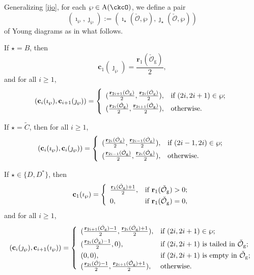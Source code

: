 \documentclass[12pt,a4paper]{amsart}
\newcommand{\CO}{{\mathcal {O}}}
\numberwithin{equation}{section}
\theoremstyle{remark}
\begin{document}
  Generalizing \eqref{ijo}, for each $\wp\in  {\mathrm A}(\ckcO)$,    we define a pair \[
(\imath_\wp, \jmath_\wp):=(\imath_\star(\check \CO, \wp), \jmath_\star(\check \CO, \wp))
\]
 of Young diagrams  as in what follows.

If $\star=B$, then
 \[
   \mathbf c_{1}(\jmath_\wp)=\frac{\mathbf r_1(\check \CO_{\mathrm g})}{2},
\]
and for all $i\geq 1$,
\[
(\mathbf c_{i}(\imath_\wp), \mathbf c_{i+1}(\jmath_\wp))=
   \left\{
     \begin{array}{ll}
           (\frac{\mathbf r_{2i+1}(\check \CO_{\mathrm g})}{2},  \frac{\mathbf r_{2i}(\check \CO_{\mathrm g})}{2}), &\hbox{if $(2i, 2i+1)\in \wp$}; \smallskip\\
            (\frac{\mathbf r_{2i}(\check \CO_{\mathrm g})}{2},  \frac{\mathbf r_{2i+1}(\check \CO_{\mathrm g})}{2}), &\hbox{otherwise}.\\
            \end{array}
   \right.
\]


If $\star=\widetilde{C}$, then for all $i\geq 1$,
\[
(\mathbf c_{i}(\imath_\wp), \mathbf c_{i}(\jmath_\wp))=
   \left\{
     \begin{array}{ll}
           (\frac{\mathbf r_{2i}(\check \CO_{\mathrm g})}{2},  \frac{\mathbf r_{2i-1}(\check \CO_{\mathrm g})}{2}), &\hbox{if $(2i-1, 2i)\in \wp$}; \smallskip\\
            (\frac{\mathbf r_{2i-1}(\check \CO_{\mathrm g})}{2},  \frac{\mathbf r_{2i}(\check \CO_{\mathrm g})}{2}), &\hbox{otherwise}.\\
            \end{array}
   \right.
\]


If $\star\in\{D,D^*\}$, then
 \[
   \mathbf c_{1}(\imath_\wp)= \left\{
     \begin{array}{ll}
            \frac{\mathbf r_1(\check \CO_{\mathrm g})+1}{2},   &\hbox{if $\mathbf r_1(\check \CO_{\mathrm g})>0$}; \smallskip\\
       0,  &\hbox{if $\mathbf r_1(\check \CO_{\mathrm g})=0$},\\
            \end{array}
   \right.
 \]
and for all $i\geq 1$,
\[
(\mathbf c_{i}(\jmath_\wp), \mathbf c_{i+1}(\imath_\wp))=
   \left\{
     \begin{array}{ll}
            (\frac{\mathbf r_{2i+1}(\check \CO_{\mathrm g})-1}{2},  \frac{\mathbf r_{2i}(\check \CO_{\mathrm g})+1}{2}), &\hbox{if $(2i, 2i+1)\in \wp$}; \smallskip\\
        (\frac{\mathbf r_{2i}(\check \CO_{\mathrm g})-1}{2},  0), & \hbox{if $(2i, 2i+1)$ is tailed in $\check \CO_{\mathrm g}$};\smallskip\\
         (0,  0), &\hbox{if $(2i, 2i+1)$ is empty in $\check \CO_{\mathrm g}$};\\
         (\frac{\mathbf r_{2i}(\check \CO)-1}{2},  \frac{\mathbf r_{2i+1}(\check \CO_{\mathrm g})+1}{2}), &\hbox{otherwise}.\\
            \end{array}
   \right.
\]
\end{document}
